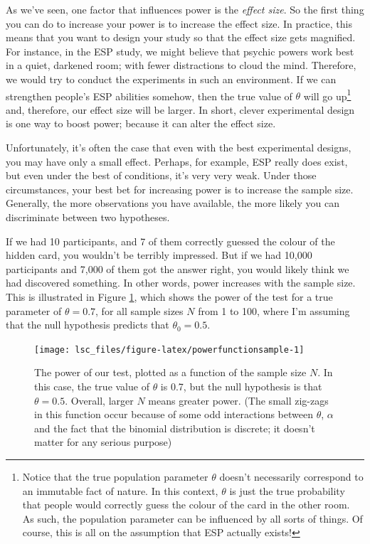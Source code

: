 \documentclass[
]{book}
\theoremstyle{definition}
\theoremstyle{definition}
\theoremstyle{definition}
\theoremstyle{definition}
\theoremstyle{remark}
\begin{document}
As we've seen, one factor that influences power is the \emph{effect size}. So the first thing you can do to increase your power is to increase the effect size. In practice, this means that you want to design your study so that the effect size gets magnified. For instance, in the ESP study, we might believe that psychic powers work best in a quiet, darkened room; with fewer distractions to cloud the mind. Therefore, we would try to conduct the experiments in such an environment. If we can strengthen people's ESP abilities somehow, then the true value of \(\theta\) will go up\footnote{Notice that the true population parameter \(\theta\) doesn't necessarily correspond to an immutable fact of nature. In this context, \(\theta\) is just the true probability that people would correctly guess the colour of the card in the other room. As such, the population parameter can be influenced by all sorts of things. Of course, this is all on the assumption that ESP actually exists!} and, therefore, our effect size will be larger. In short, clever experimental design is one way to boost power; because it can alter the effect size.

Unfortunately, it's often the case that even with the best experimental designs, you may have only a small effect. Perhaps, for example, ESP really does exist, but even under the best of conditions, it's very very weak. Under those circumstances, your best bet for increasing power is to increase the sample size. Generally, the more observations you have available, the more likely you can discriminate between two hypotheses.

If we had 10 participants, and 7 of them correctly guessed the colour of the hidden card, you wouldn't be terribly impressed. But if we had 10,000 participants and 7,000 of them got the answer right, you would likely think we had discovered something. In other words, power increases with the sample size. This is illustrated in Figure \ref{fig:powerfunctionsample}, which shows the power of the test for a true parameter of \(\theta = 0.7\), for all sample sizes \(N\) from 1 to 100, where I'm assuming that the null hypothesis predicts that \(\theta_0 = 0.5\).

\begin{figure}

{\centering \texttt{[image: lsc\_files/figure-latex/powerfunctionsample-1]} 

}

\caption{The power of our test, plotted as a function of the sample size $N$. In this case, the true value of $\theta$ is 0.7, but the null hypothesis is that $\theta = 0.5$. Overall, larger $N$ means greater power. (The small zig-zags in this function occur because of some odd interactions between $\theta$, $\alpha$ and the fact that the binomial distribution is discrete; it doesn't matter for any serious purpose) }\label{fig:powerfunctionsample}
\end{figure}
\end{document}
